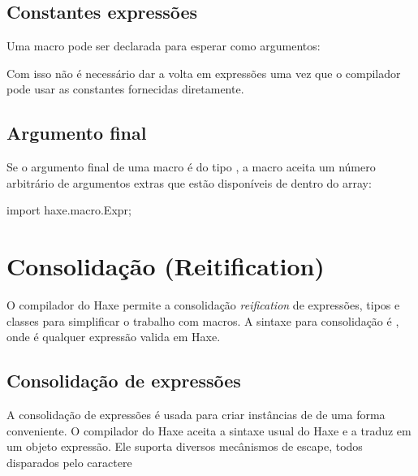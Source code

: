 \subsection{Constantes expressões}
\label{macro-constant-arguments}

Uma macro pode ser declarada para esperar  como argumentos:


Com isso não é necessário dar a volta em expressões uma vez que o compilador pode usar as constantes fornecidas diretamente.

\subsection{Argumento final}
\label{macro-rest-argument}

Se o argumento final de uma macro é do tipo , a macro aceita um número arbitrário de argumentos extras que estão disponíveis de dentro do array:

import haxe.macro.Expr;




\section{Consolidação (Reitification)}
\label{macro-reification}


O compilador do Haxe permite a consolidação  \emph{reification} de expressões,  tipos e classes para simplificar o trabalho com macros. A sintaxe para consolidação é , onde  é qualquer expressão valida em Haxe.

\subsection{Consolidação de expressões}
\label{macro-reification-expression}

A consolidação de expressões é usada para criar instâncias de  de uma forma conveniente. O compilador do Haxe aceita a sintaxe usual do Haxe e a traduz em um objeto expressão. Ele suporta diversos mecânismos de escape, todos disparados pelo caractere \expr{\$}

